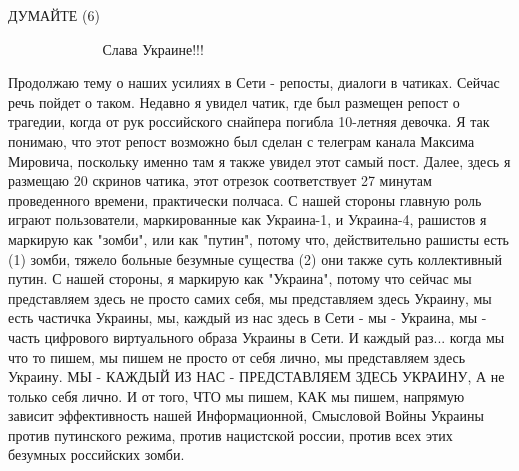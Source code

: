  
 
 
 
 

ДУМАЙТЕ (6)

💛 💙 💛 💙 💛 💙 💛 💙 💛 💙 💛
Слава Украине!!! 

Продолжаю тему о наших усилиях в Сети - репосты, диалоги в чатиках. Сейчас речь
пойдет о таком. Недавно я увидел чатик, где был размещен репост о трагедии,
когда от рук российского снайпера погибла 10-летняя девочка. Я так понимаю, что
этот репост возможно был сделан с телеграм канала Максима Мировича, поскольку
именно там я также увидел этот самый пост. Далее, здесь я размещаю 20 скринов
чатика, этот отрезок соответствует 27 минутам проведенного времени, практически
полчаса. С нашей стороны главную роль играют пользователи, маркированные как
Украина-1, и Украина-4, рашистов я маркирую как "зомби", или как "путин",
потому что, действительно рашисты есть (1) зомби, тяжело больные безумные
существа (2) они также суть коллективный путин. С нашей стороны, я маркирую как
"Украина", потому что сейчас мы представляем здесь не просто самих себя, мы
представляем здесь Украину, мы есть частичка Украины, мы, каждый из нас здесь в
Сети - мы - Украина, мы - часть цифрового виртуального образа Украины в Сети. И
каждый раз... когда мы что то пишем, мы пишем не просто от себя лично, мы
представляем здесь Украину. МЫ - КАЖДЫЙ ИЗ НАС - ПРЕДСТАВЛЯЕМ ЗДЕСЬ УКРАИНУ, А
не только себя лично. И от того, ЧТО мы пишем, КАК мы пишем, напрямую зависит
эффективность нашей Информационной, Смысловой Войны Украины против путинского
режима, против нацистской россии, против всех этих безумных российских зомби. 


